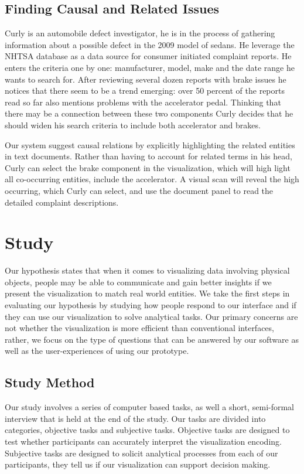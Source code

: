 \subsection{Finding Causal and Related Issues}
Curly is an automobile defect investigator, he is in the process of gathering
information about a possible defect in the 2009 model of sedans. He leverage the
NHTSA database as a data source for consumer initiated complaint reports. He
enters the criteria one by one: manufacturer, model, make and the date range he
wants to search for. After reviewing several dozen reports with brake issues he
notices that there seem to be a trend emerging: over 50 percent of the reports
read so far also mentions problems with the accelerator pedal. Thinking that
there may be a connection between these two components Curly decides that he
should widen his search criteria to include both accelerator and brakes.

Our system suggest causal relations by explicitly highlighting the related
entities in text documents. Rather than having to account for related terms in
his head, Curly can select the brake component in the visualization, which will
high light all co-occurring entities, include the accelerator. A visual scan
will reveal the high occurring, which Curly can select, and use the document
panel to read the detailed complaint descriptions.


\section{Study}
Our hypothesis states that when it comes to visualizing data involving physical
objects, people may be able to communicate and gain better insights if we
present the visualization to match real world entities. We take the first steps
in evaluating our hypothesis by studying how people respond to our \threed
interface and if they can use our visualization to solve analytical tasks. Our
primary concerns are not whether the visualization is more efficient than
conventional interfaces, rather, we focus on the type of questions that can be
answered by our software as well as the user-experiences of using our prototype.


\subsection{Study Method}
Our study involves a series of computer based tasks, as well a short,
semi-formal interview that is held at the end of the study. Our tasks are
divided into categories, objective tasks and subjective tasks. Objective tasks
are designed to test whether participants can accurately interpret the
visualization encoding. Subjective tasks are designed to solicit analytical
processes from each of our participants, they tell us if our visualization can
support decision making. 

